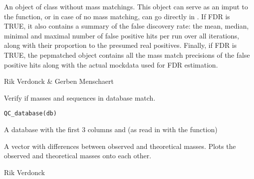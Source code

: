 \documentclass[letterpaper]{book}
\begin{document}
%
\begin{Value}
An object of class  without mass matchings. This object can serve as an imput to the  function, or in case of no mass matching, can go directly in . If FDR is TRUE, it also contains a summary of the false discovery rate: the mean, median, minimal and maximal number of false positive hits per run over all iterations, along with their proportion to the presumed real positives. Finally, if FDR is TRUE, the pepmatched object contains all the mass match precisions of the false positive hits along with the actual mockdata used for FDR estimation.
\end{Value}
%
\begin{Author}\relax
Rik Verdonck \& Gerben Menschaert
\end{Author}
%
\begin{SeeAlso}\relax
{}
\end{SeeAlso}
%
\begin{Description}\relax
Verify if masses and sequences in database match.
\end{Description}
%
\begin{Usage}
\begin{verbatim}
QC_database(db)
\end{verbatim}
\end{Usage}
%
\begin{Arguments}
\begin{ldescription}
\item[\code{db}] A database with the first 3 columns  and  (as read in with the  function)
\end{ldescription}
\end{Arguments}
%
\begin{Value}
A vector with differences between observed and theoretical masses. Plots the observed and theoretical masses onto each other.
\end{Value}
%
\begin{Author}\relax
Rik Verdonck
\end{Author}
%
\begin{SeeAlso}\relax
{}
\end{SeeAlso}
\end{document}
